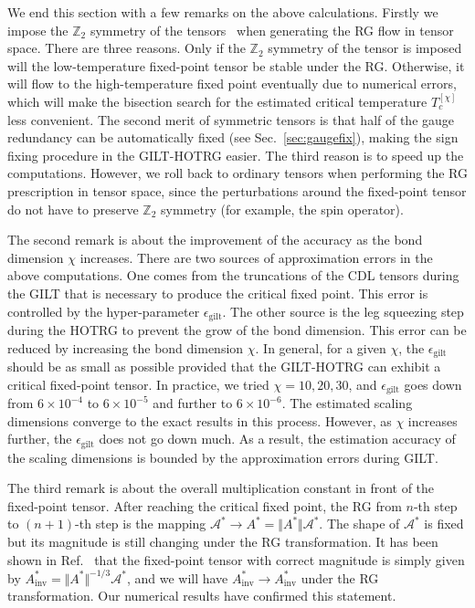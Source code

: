 \documentclass[aps,prr,reprint,superscriptaddress,floatfix]{revtex4-2}
\begin{document}
We end this section with a few remarks on the above calculations. 
Firstly we impose the $\mathbb{Z}_2$ symmetry of the tensors~\cite{Singh2010SymTen, Singh2011U1Ten} when generating the RG flow in tensor space. 
There are three reasons. 
Only if the $\mathbb{Z}_2$ symmetry of the tensor is imposed will the low-temperature fixed-point tensor be stable under the RG.  
Otherwise, it will flow to the high-temperature fixed point eventually due to numerical errors, which will make the bisection search for the estimated critical temperature $T_c^{[\chi]}$ less convenient. 
The second merit of symmetric tensors is that half of the gauge redundancy can be automatically fixed (see Sec.~\ref{sec:gaugefix}), making the sign fixing procedure in the GILT-HOTRG easier. 
The third reason is to speed up the computations. 
However, we roll back to ordinary tensors when performing the RG prescription in tensor space, since the perturbations around the fixed-point tensor do not have to preserve $\mathbb{Z}_2$ symmetry (for example, the spin operator). 
%

The second remark is about the improvement of the accuracy as the bond dimension $\chi$ increases. 
There are two sources of approximation errors in the above computations. 
One comes from the truncations of the CDL tensors during the GILT that is necessary to produce the critical fixed point. 
This error is controlled by the hyper-parameter $\epsilon_{\text{gilt}}$. 
The other source is the leg squeezing step during the HOTRG to prevent the grow of the bond dimension.
This error can be reduced by increasing the bond dimension $\chi$. 
In general, for a given $\chi$, the $\epsilon_{\text{gilt}}$ should be as small as possible provided that the GILT-HOTRG can exhibit a critical fixed-point tensor. 
In practice, we tried $\chi = 10, 20, 30$, and $\epsilon_{\text{gilt}}$ goes down from $6\times 10^{-4}$ to $6\times10^{-5}$ and further to $6\times10^{-6}$. 
The estimated scaling dimensions converge to the exact results in this process. 
However, as $\chi$ increases further, the $\epsilon_{\text{gilt}}$ does not go down much. 
As a result, the estimation accuracy of the scaling dimensions is bounded by the approximation errors during GILT. 
%

The third remark is about the overall multiplication constant in front of the fixed-point tensor. 
After reaching the critical fixed point, the RG from $n$-th step to $(n+1)$-th step is the mapping $\mathcal{A}^{*}\rightarrow A^{*} = \Vert A^{*} \Vert \mathcal{A}^{*}$. 
The shape of $\mathcal{A}^*$ is fixed but its magnitude is still changing under the RG transformation. 
It has been shown in Ref.~\cite{GuWen2009} that the fixed-point tensor with correct magnitude is simply given by $A^*_{\text{inv}} = \Vert A^* \Vert^{-1/3} \mathcal{A}^*$, and we will have $A^*_{\text{inv}}\rightarrow A^*_{\text{inv}}$ under the RG transformation.
Our numerical results have confirmed this statement.
%
\end{document}
